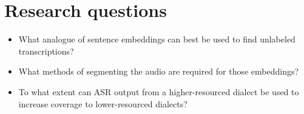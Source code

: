 \documentclass{article}[11pt]
\begin{document}
\section{Research questions}

\begin{itemize}
    \item What analogue of sentence embeddings can best be used to find unlabeled transcriptions?
    
    \item What methods of segmenting the audio are required for those embeddings?
    
    \item To what extent can ASR output from a higher-resourced dialect be used to increase coverage to lower-resourced dialects?
    
\end{itemize}


%
\end{document}
